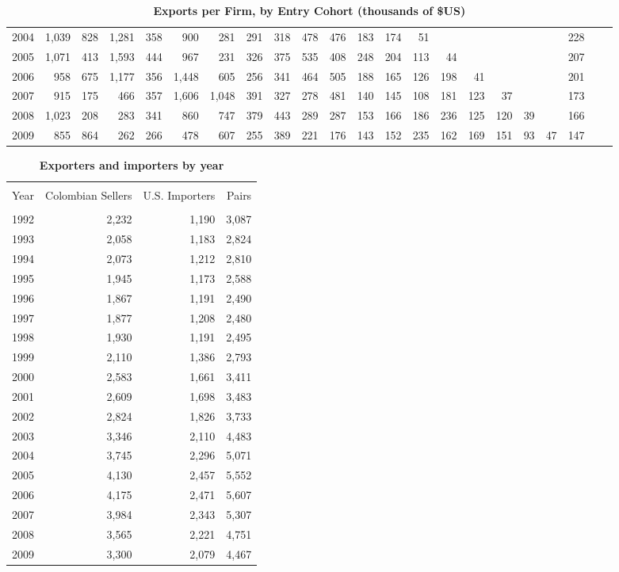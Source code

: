 \documentclass[12pt]{article}
\begin{document}
\begin{table}
{\begin{tabular}{l|rrrrrrrrrrrrrrrrrrrr|r}
2004 & 1,039 & 828  & 1,281 & 358  & 900   & 281   & 291  & 318  & 478  & 476  & 183  & 174  & 51   &      &      &      &      &      & 228 \\
2005 & 1,071 & 413  & 1,593 & 444  & 967   & 231   & 326  & 375  & 535  & 408  & 248  & 204  & 113  & 44   &      &      &      &      & 207 \\
2006 & 958   & 675  & 1,177 & 356  & 1,448 & 605   & 256  & 341  & 464  & 505  & 188  & 165  & 126  & 198  & 41   &      &      &      & 201 \\
2007 & 915   & 175  & 466   & 357  & 1,606 & 1,048 & 391  & 327  & 278  & 481  & 140  & 145  & 108  & 181  & 123  & 37   &      &      & 173 \\
2008 & 1,023 & 208  & 283   & 341  & 860   & 747   & 379  & 443  & 289  & 287  & 153  & 166  & 186  & 236  & 125  & 120  & 39   &      & 166 \\
2009 & 855   & 864  & 262   & 266  & 478   & 607   & 255  & 389  & 221  & 176  & 143  & 152  & 235  & 162  & 169  & 151  & 93   & 47   & 147 \\ \hline
    \end{tabular}
    }
    \caption{\textbf{Exports per Firm, by Entry Cohort (thousands of \$US)}}
    \label{tab:exp_per_firm_by_cohort}\centering
\end{table}

\begin{table}[bph]
\centering
\begin{tabular}{lrrr}
\hline\hline
&  &  &  \\[1px] 
Year & Colombian Sellers & U.S. Importers & Pairs \\ \hline
&  &  &  \\[1px] 
1992 & 2,232 & 1,190 & 3,087 \\ 
1993 & 2,058 & 1,183 & 2,824 \\ 
1994 & 2,073 & 1,212 & 2,810 \\ 
1995 & 1,945 & 1,173 & 2,588 \\ 
1996 & 1,867 & 1,191 & 2,490 \\ 
1997 & 1,877 & 1,208 & 2,480 \\ 
1998 & 1,930 & 1,191 & 2,495 \\ 
1999 & 2,110 & 1,386 & 2,793 \\ 
2000 & 2,583 & 1,661 & 3,411 \\ 
2001 & 2,609 & 1,698 & 3,483 \\ 
2002 & 2,824 & 1,826 & 3,733 \\ 
2003 & 3,346 & 2,110 & 4,483 \\ 
2004 & 3,745 & 2,296 & 5,071 \\ 
2005 & 4,130 & 2,457 & 5,552 \\ 
2006 & 4,175 & 2,471 & 5,607 \\ 
2007 & 3,984 & 2,343 & 5,307 \\ 
2008 & 3,565 & 2,221 & 4,751 \\ 
2009 & 3,300 & 2,079 & 4,467 \\ \hline
\end{tabular}
\centering{\small \ }
\caption{\textbf{Exporters and importers by year}}
\label{tab:ex_im_by_year}
\end{table}
\end{document}
